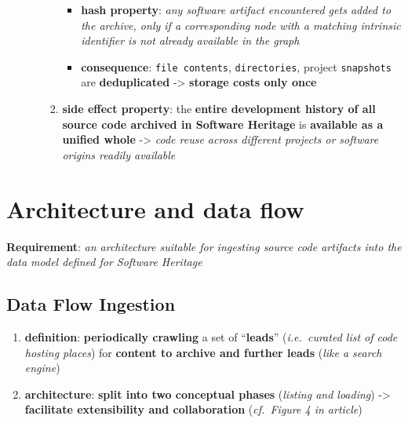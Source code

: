 \documentclass[11pt]{article}
\providecommand{\tightlist}{%
      \setlength{\itemsep}{0pt}\setlength{\parskip}{0pt}}
\begin{document}
\begin{enumerate}
\begin{itemize}
\begin{enumerate}
      \begin{itemize}
      \tightlist
      \item
        \textbf{hash property}: \emph{any software artifact encountered
        gets added to the archive, only if a corresponding node with a
        matching intrinsic identifier is not already available in the
        graph}
      \item
        \textbf{consequence}: \texttt{file\ contents},
        \texttt{directories}, project \texttt{snapshots} are
        \textbf{deduplicated} -\textgreater{} \textbf{storage costs only
        once}
      \end{itemize}
    \item
      \textbf{side effect property}: the \textbf{entire development
      history of all source code archived in Software Heritage} is
      \textbf{available as a unified whole} -\textgreater{} \emph{code
      reuse across different projects or software origins readily
      available}
    \end{enumerate}
  \end{itemize}
\end{enumerate}

\hypertarget{architecture-and-data-flow}{%
\section{Architecture and data flow}\label{architecture-and-data-flow}}

\textbf{Requirement}: \emph{an architecture suitable for ingesting
source code artifacts into the data model defined for Software Heritage}

\hypertarget{data-flow-ingestion}{%
\subsection{Data Flow Ingestion}\label{data-flow-ingestion}}

\begin{enumerate}
\def\labelenumi{\arabic{enumi}.}
\tightlist
\item
  \textbf{definition}: \textbf{periodically crawling} a set of
  ``\textbf{leads}'' (\emph{i.e.~curated list of code hosting places})
  for \textbf{content to archive and further leads} (\emph{like a search
  engine})
\item
  \textbf{architecture}: \textbf{split into two conceptual phases}
  (\emph{listing and loading}) -\textgreater{} \textbf{facilitate
  extensibility and collaboration} (\emph{cf.~Figure 4 in article})
\end{enumerate}
\end{document}
